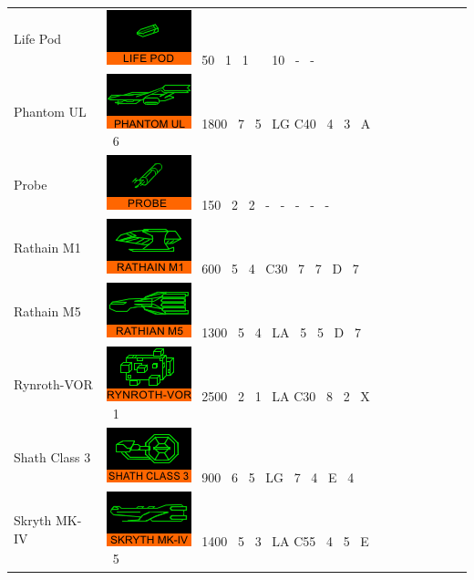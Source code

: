 \begin{itemize}
\begin{tabular}{ | l | l | l | l | l | l | l | l | l | }
Life Pod & \includegraphics{images/ship_lifepod.png} \ 50 \ 1 \ 1 \  \  \ 10 \ - \ - \\
Phantom UL & \includegraphics{images/ship_phantom UL.png} \ 1800 \ 7 \ 5 \ LG C40 \ 4 \ 3 \ A \ 6 \\
Probe & \includegraphics{images/ship_probe.png} \ 150 \ 2 \ 2 \ - \ - \ - \ - \ - \\
Rathain M1 & \includegraphics{images/ship_rathain_m1.png} \ 600 \ 5 \ 4 \ C30 \ 7 \ 7 \ D \ 7 \\
Rathain M5 & \includegraphics{images/ship_rathian_m5.png}  \ 1300 \ 5 \ 4 \ LA \ 5 \ 5 \ D \ 7 \\
Rynroth-VOR & \includegraphics{images/ship_rynroth-vor.png} \ 2500 \ 2 \ 1 \ LA C30 \ 8 \ 2 \ X \ 1 \\
Shath Class 3 & \includegraphics{images/ship_shath_class_3.png} \ 900 \ 6 \ 5 \ LG \ 7 \ 4 \ E \ 4 \\
Skryth MK-IV & \includegraphics{images/ship_skryth_mk_iv.png} \ 1400 \ 5 \ 3 \ LA C55 \ 4 \ 5 \ E \ 5 \\

\end{tabular}
\end{itemize}
